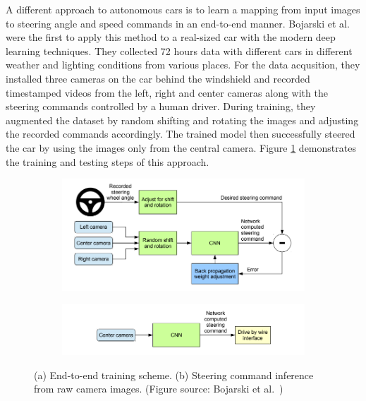 A different approach to autonomous cars is to learn a mapping from input images
to steering angle and speed commands in an end-to-end manner. Bojarski et al.\
\cite{Bojarski2016EndTE} were the first to apply this method to a real-sized
car with the modern deep learning techniques. They collected 72 hours data
with different cars in different weather and lighting conditions from various
places. For the data acqusition, they installed three cameras on the car behind
the windshield and recorded timestamped videos from the left, right and center
cameras along with the steering commands controlled by a human driver. During
training, they augmented the dataset by random shifting and rotating the images
and adjusting the recorded commands accordingly. The trained model then
successfully steered the car by using the images only from the central camera.
Figure \ref{figure:end-to-end-network} demonstrates the training and testing
steps of this approach.

\begin{figure}[h]
  \centering
  \begin{subfigure}[b]{1.0\linewidth}
    \includegraphics[width=\linewidth]{figures/end-to-end-training.png}
    \caption{}
  \end{subfigure}
  \begin{subfigure}[b]{1.0\linewidth}
    \includegraphics[width=\linewidth]{figures/end-to-end-inference.png}
    \caption{}
  \end{subfigure}
  \caption[End-to-end training and inference]{(a) End-to-end training scheme.
    (b) Steering command inference from raw camera images. (Figure source:
    Bojarski et al.\ \cite{Bojarski2016EndTE})}
  \label{figure:end-to-end-network}
\end{figure}

